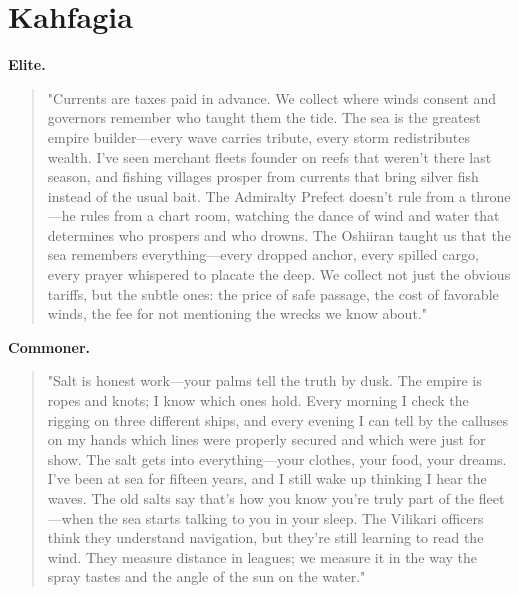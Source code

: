 \section*{Kahfagia}
\textbf{Elite.}
\begin{quote}
"Currents are taxes paid in advance. We collect where winds consent and governors remember who taught them the tide. The sea is the greatest empire builder—every wave carries tribute, every storm redistributes wealth. I've seen merchant fleets founder on reefs that weren't there last season, and fishing villages prosper from currents that bring silver fish instead of the usual bait. The Admiralty Prefect doesn't rule from a throne—he rules from a chart room, watching the dance of wind and water that determines who prospers and who drowns. The Oshiiran taught us that the sea remembers everything—every dropped anchor, every spilled cargo, every prayer whispered to placate the deep. We collect not just the obvious tariffs, but the subtle ones: the price of safe passage, the cost of favorable winds, the fee for not mentioning the wrecks we know about."
\end{quote}
\textbf{Commoner.}
\begin{quote}
"Salt is honest work—your palms tell the truth by dusk. The empire is ropes and knots; I know which ones hold. Every morning I check the rigging on three different ships, and every evening I can tell by the calluses on my hands which lines were properly secured and which were just for show. The salt gets into everything—your clothes, your food, your dreams. I've been at sea for fifteen years, and I still wake up thinking I hear the waves. The old salts say that's how you know you're truly part of the fleet—when the sea starts talking to you in your sleep. The Vilikari officers think they understand navigation, but they're still learning to read the wind. They measure distance in leagues; we measure it in the way the spray tastes and the angle of the sun on the water."
\end{quote}

